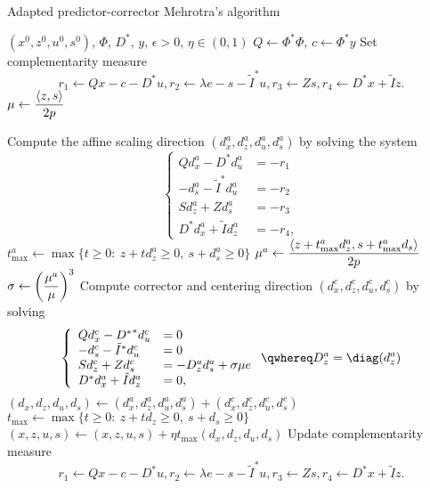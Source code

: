 \begin{algorithm}
  \caption{Adapted predictor-corrector Mehrotra's algorithm}\label{alg:main}
  \begin{algorithmic}
    \Require $(x^0,z^0,u^0,s^0)$, $\Phi$, $D^*$, $y$, $\epsilon > 0$, $\eta \in (0,1)$
    \State $Q \gets \Phi^* \Phi$, $c \gets \Phi^* y$
    \State Set complementarity measure
    \[
          r_1 \gets Qx-c-D^*u,
          r_2 \gets \lambda e-s-\tilde{I}^*u,
          r_3 \gets Zs,
          r_4 \gets D^*x+\tilde{I}z.
    \] 
    \State $\mu \gets \displaystyle{\langle z,s\rangle\over 2p}$

    \State Compute the affine scaling direction $(d_x^a,d_z^a,d_u^a,d_s^a)$ by solving the system
    \[
      \left\{
        \begin{array}{ll}
          Qd_x^a-D^*d_u^a&=-r_1 \\
          -d_s^a-\tilde{I}^*d_u^a&=-r_2 \\
          Sd_z^a+Zd_s^a&=-r_3 \\
          D^*d_x^a+\tilde{I}d_z^a&=-r_4,
        \end{array}
      \right.
    \]
    \State $t^a_{\max} \gets \max\{ t\geq 0:\ z+td_z^a\geq 0,\ s+d_s^a\geq 0\}$
    \State $\mu^a \gets \displaystyle{\langle z+t_{\max}^ad_z^a,s+t_{\max}^ad_s\rangle\over 2p}$
    \State $\sigma \gets \displaystyle{\left(\mu^a\over\mu\right)^3}$ 
    \State Compute corrector and centering direction $(d_x^c,d_z^c,d_u^c,d_s^c)$ by solving
    \[
      \left\{
        \begin{array}{ll}
          Qd_x^c-{D^*}^*d_u^c&=0\\
          -d_s^c-\tilde{I}^*d_u^c&=0\\
          Sd_z^c+Zd_s^c&=-D_z^ad_s^a+\sigma\mu e\\
          D^*d_x^a+\tilde{I}d_z^a&=0,
        \end{array}
      \right. \qwhereq D_z^a=\diag(d_z^a)
    \]
    \State $(d_x,d_z,d_u,d_s) \gets (d_x^a,d_z^a,d_u^a,d_s^a)+(d_x^c,d_z^c,d_u^c,d_s^c)$ 
    \State $t_{\max} \gets \max\{ t\geq 0:\ z+td_z\geq 0,\ s+d_s\geq 0\}$
    \State $(x,z,u,s) \gets (x,z,u,s)+\eta t_{\max}(d_x,d_z,d_u,d_s)$
    \State Update complementarity measure
    \[
          r_1 \gets Qx-c-D^*u,
          r_2 \gets \lambda e-s-\tilde{I}^*u,
          r_3 \gets Zs,
          r_4 \gets D^*x+\tilde{I}z.
    \]
    \EndWhile
  \end{algorithmic}
\end{algorithm}